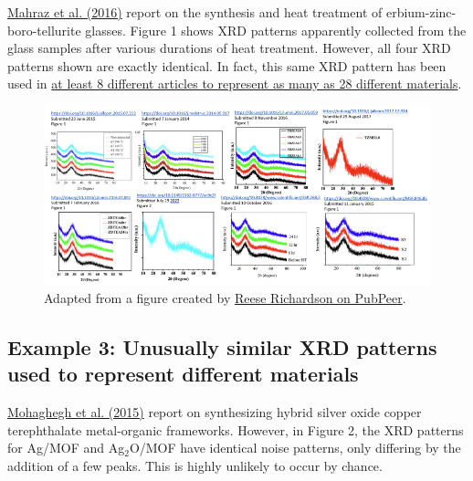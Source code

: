 \documentclass[letterpaper, 12pt]{article}
\begin{document}
\href{https://doi.org/10.1016/j.jlumin.2016.07.051}{Mahraz et al. (2016)} report on the synthesis and heat treatment of erbium-zinc-boro-tellurite glasses. Figure 1 shows XRD patterns apparently collected from the glass samples after various durations of heat treatment. However, all four XRD patterns shown are exactly identical. In fact, this same XRD pattern has been used in \href{https://pubpeer.com/publications/27A40862805C08DD269520435EAC67\#1}{at least 8 different articles to represent as many as 28 different materials}.

\begin{figure}[h!tbp]
    \centering
    \includegraphics[width=\textwidth]{img/xrd_data_duplication/same_xrd_different_articles_small.png}
    \caption*{Adapted from a figure created by \href{https://pubpeer.com/publications/8A1A8F322680DFB05011853190C254\#1}{Reese Richardson on PubPeer}.}
\end{figure}

\pagebreak

\subsection*{Example 3: Unusually similar XRD patterns used to represent different materials}

\href{https://doi.org/10.1007/s10853-015-9003-3}{Mohaghegh et al. (2015)} report on synthesizing hybrid silver oxide copper terephthalate metal-organic frameworks. However, in Figure 2, the XRD patterns for Ag/MOF and Ag$_\text{2}$O/MOF have identical noise patterns, only differing by the addition of a few peaks. This is highly unlikely to occur by chance. 
\end{document}
